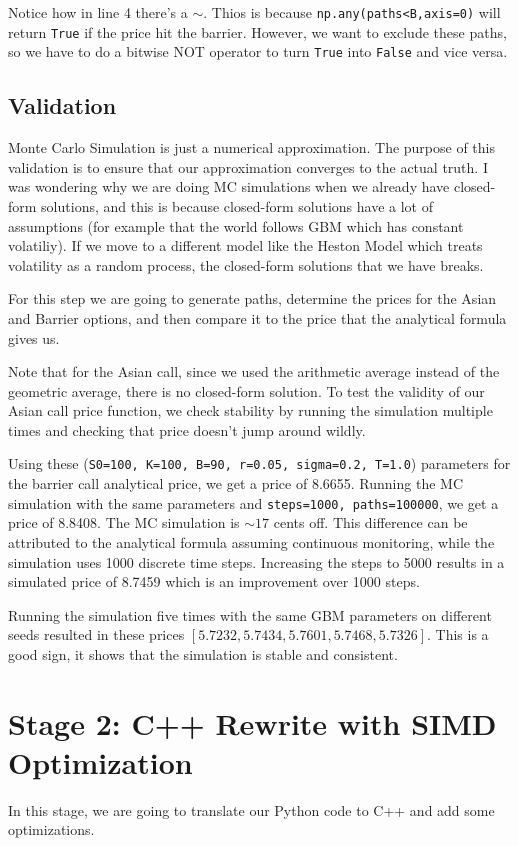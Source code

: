 \documentclass{article}
\begin{document}
Notice how in line 4 there's a \(\sim\). Thios is because \texttt{np.any(paths<B,axis=0)} will return \texttt{True} if the price hit the barrier. 
However, we want to exclude these paths, so we have to do a bitwise NOT operator to turn \texttt{True} into \texttt{False} and vice versa.

\subsection*{Validation}
Monte Carlo Simulation is just a numerical approximation.
The purpose of this validation is to ensure that our approximation converges to the actual truth.
I was wondering why we are doing MC simulations when we already have closed-form solutions,
and this is because closed-form solutions have a lot of assumptions (for example that the world follows GBM which has constant volatiliy).
If we move to a different model like the Heston Model which treats volatility as a random process, the closed-form solutions that we have breaks.

For this step we are going to generate paths, determine the prices for the Asian and Barrier options, and then compare it to the price that the analytical formula gives us.

Note that for the Asian call, since we used the arithmetic average instead of the geometric average, there is no closed-form solution.
To test the validity of our Asian call price function, we check stability by running the simulation multiple times and checking that price doesn't jump around wildly.

Using these (\texttt{S0=100, K=100, B=90, r=0.05, sigma=0.2, T=1.0}) parameters for the barrier call analytical price, we get a price of 8.6655.
Running the MC simulation with the same parameters and \texttt{steps=1000, paths=100000}, we get a price of 8.8408.
The MC simulation is \(\sim17\) cents off. This difference can be attributed to the analytical formula assuming continuous monitoring, while the simulation uses 1000 discrete time steps.
Increasing the steps to 5000 results in a simulated price of 8.7459 which is an improvement over 1000 steps. 

Running the simulation five times with the same GBM parameters on different seeds resulted in these prices \([5.7232,5.7434,5.7601,5.7468,5.7326]\).
This is a good sign, it shows that the simulation is stable and consistent.

\section*{Stage 2: C++ Rewrite with SIMD Optimization}
In this stage, we are going to translate our Python code to C++ and add some optimizations. 
\end{document}
